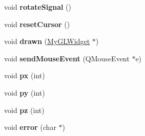 \begin{DoxyCompactItemize}
\item 
\hypertarget{class_my_g_l_widget_ade3ba58be746aae71a193d90713523bb}{void {\bfseries rotate\-Signal} ()}\label{class_my_g_l_widget_ade3ba58be746aae71a193d90713523bb}

\item 
\hypertarget{class_my_g_l_widget_ae7a81b980b3d2b12b09d4dd6c0869660}{void {\bfseries reset\-Cursor} ()}\label{class_my_g_l_widget_ae7a81b980b3d2b12b09d4dd6c0869660}

\item 
\hypertarget{class_my_g_l_widget_a1dc1c7ac7e6aa9c3caef3d644b6cf313}{void {\bfseries drawn} (\hyperlink{class_my_g_l_widget}{My\-G\-L\-Widget} $\ast$)}\label{class_my_g_l_widget_a1dc1c7ac7e6aa9c3caef3d644b6cf313}

\item 
\hypertarget{class_my_g_l_widget_abb0f0edbe33cf35dadc733d92e469334}{void {\bfseries send\-Mouse\-Event} (Q\-Mouse\-Event $\ast$e)}\label{class_my_g_l_widget_abb0f0edbe33cf35dadc733d92e469334}

\item 
\hypertarget{class_my_g_l_widget_ac0f66adcfd8b43c1b33641011c7a3d05}{void {\bfseries px} (int)}\label{class_my_g_l_widget_ac0f66adcfd8b43c1b33641011c7a3d05}

\item 
\hypertarget{class_my_g_l_widget_a3fd4b7f4b345747704e9a9fb58ab8cad}{void {\bfseries py} (int)}\label{class_my_g_l_widget_a3fd4b7f4b345747704e9a9fb58ab8cad}

\item 
\hypertarget{class_my_g_l_widget_a2c65f761f5fbf222e447fb08850c3992}{void {\bfseries pz} (int)}\label{class_my_g_l_widget_a2c65f761f5fbf222e447fb08850c3992}

\item 
\hypertarget{class_my_g_l_widget_afa3b963f305a4b0ad4c87f4ce8e0d4b8}{void {\bfseries error} (char $\ast$)}\label{class_my_g_l_widget_afa3b963f305a4b0ad4c87f4ce8e0d4b8}

\end{DoxyCompactItemize}
